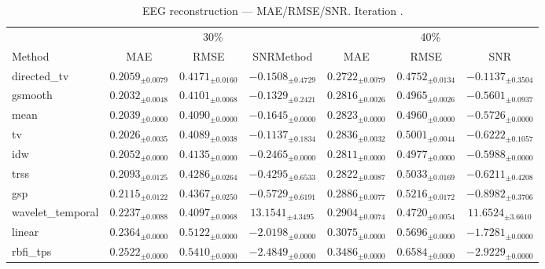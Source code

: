 ﻿%
\begin{table}[ht]
\centering
\caption[EEG reconstruction - Iteration it19]{EEG reconstruction — MAE/RMSE/SNR. Iteration .}
\label{tab:main_it19_synthetic_beta_high_missing}
\small
\begin{tabular}{lcccccc}
\toprule
\multicolumn{1}{c}{} & \multicolumn{3}{c}{30\%} & \multicolumn{3}{c}{40\%} \\
\cmidrule(lr){2-4} \cmidrule(lr){5-7}
Method & MAE & RMSE & SNRMethod & MAE & RMSE & SNR \\
\midrule
directed\_tv & $0.2059_{\pm 0.0079}$ & $0.4171_{\pm 0.0160}$ & $-0.1508_{\pm 0.4729}$ & $0.2722_{\pm 0.0079}$ & $0.4752_{\pm 0.0134}$ & $-0.1137_{\pm 0.3504}$ \\
gsmooth & $0.2032_{\pm 0.0048}$ & $0.4101_{\pm 0.0068}$ & $-0.1329_{\pm 0.2421}$ & $0.2816_{\pm 0.0026}$ & $0.4965_{\pm 0.0026}$ & $-0.5601_{\pm 0.0937}$ \\
mean & $0.2039_{\pm 0.0000}$ & $0.4090_{\pm 0.0000}$ & $-0.1645_{\pm 0.0000}$ & $0.2823_{\pm 0.0000}$ & $0.4960_{\pm 0.0000}$ & $-0.5726_{\pm 0.0000}$ \\
tv & $0.2026_{\pm 0.0035}$ & $0.4089_{\pm 0.0038}$ & $-0.1137_{\pm 0.1834}$ & $0.2836_{\pm 0.0032}$ & $0.5001_{\pm 0.0044}$ & $-0.6222_{\pm 0.1057}$ \\
idw & $0.2052_{\pm 0.0000}$ & $0.4135_{\pm 0.0000}$ & $-0.2465_{\pm 0.0000}$ & $0.2811_{\pm 0.0000}$ & $0.4977_{\pm 0.0000}$ & $-0.5988_{\pm 0.0000}$ \\
trss & $0.2093_{\pm 0.0125}$ & $0.4286_{\pm 0.0264}$ & $-0.4295_{\pm 0.6533}$ & $0.2822_{\pm 0.0087}$ & $0.5033_{\pm 0.0169}$ & $-0.6211_{\pm 0.4208}$ \\
gsp & $0.2115_{\pm 0.0122}$ & $0.4367_{\pm 0.0250}$ & $-0.5729_{\pm 0.6191}$ & $0.2886_{\pm 0.0077}$ & $0.5216_{\pm 0.0172}$ & $-0.8982_{\pm 0.3706}$ \\
wavelet\_temporal & $0.2237_{\pm 0.0088}$ & $0.4097_{\pm 0.0068}$ & $13.1541_{\pm 4.3495}$ & $0.2904_{\pm 0.0074}$ & $0.4720_{\pm 0.0054}$ & $11.6524_{\pm 3.6610}$ \\
linear & $0.2364_{\pm 0.0000}$ & $0.5122_{\pm 0.0000}$ & $-2.0198_{\pm 0.0000}$ & $0.3075_{\pm 0.0000}$ & $0.5696_{\pm 0.0000}$ & $-1.7281_{\pm 0.0000}$ \\
rbfi\_tps & $0.2522_{\pm 0.0000}$ & $0.5410_{\pm 0.0000}$ & $-2.4849_{\pm 0.0000}$ & $0.3486_{\pm 0.0000}$ & $0.6584_{\pm 0.0000}$ & $-2.9229_{\pm 0.0000}$ \\

\end{tabular}
\end{table}
